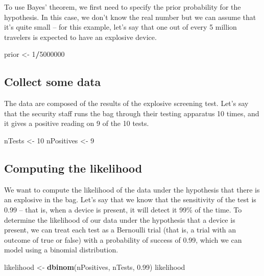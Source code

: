 \documentclass[]{book}
\newenvironment{Shaded}{\begin{snugshade}}{\end{snugshade}}
\newcommand{\KeywordTok}[1]{\textcolor[rgb]{0.13,0.29,0.53}{\textbf{#1}}}
\newcommand{\DecValTok}[1]{\textcolor[rgb]{0.00,0.00,0.81}{#1}}
\newcommand{\FloatTok}[1]{\textcolor[rgb]{0.00,0.00,0.81}{#1}}
\newcommand{\StringTok}[1]{\textcolor[rgb]{0.31,0.60,0.02}{#1}}
\newcommand{\OperatorTok}[1]{\textcolor[rgb]{0.81,0.36,0.00}{\textbf{#1}}}
\newcommand{\NormalTok}[1]{#1}
\theoremstyle{definition}
\theoremstyle{definition}
\theoremstyle{definition}
\theoremstyle{remark}
\begin{document}
To use Bayes' theorem, we first need to specify the prior probability
for the hypothesis. In this case, we don't know the real number but we
can assume that it's quite small -- for this example, let's say that one
out of every 5 million travelers is expected to have an explosive
device.

\begin{Shaded}
\begin{Highlighting}[]
\NormalTok{prior <-}\StringTok{ }\DecValTok{1}\OperatorTok{/}\DecValTok{5000000}
\end{Highlighting}
\end{Shaded}

\subsection{Collect some data}\label{collect-some-data}

The data are composed of the results of the explosive screening test.
Let's say that the security staff runs the bag through their testing
apparatus 10 times, and it gives a positive reading on 9 of the 10
tests.

\begin{Shaded}
\begin{Highlighting}[]
\NormalTok{nTests <-}\StringTok{ }\DecValTok{10}
\NormalTok{nPositives <-}\StringTok{ }\DecValTok{9}
\end{Highlighting}
\end{Shaded}

\subsection{Computing the likelihood}\label{computing-the-likelihood}

We want to compute the likelihood of the data under the hypothesis that
there is an explosive in the bag. Let's say that we know that the
sensitivity of the test is 0.99 -- that is, when a device is present, it
will detect it 99\% of the time. To determine the likelihood of our data
under the hypothesis that a device is present, we can treat each test as
a Bernoulli trial (that is, a trial with an outcome of true or false)
with a probability of success of 0.99, which we can model using a
binomial distribution.

\begin{Shaded}
\begin{Highlighting}[]
\NormalTok{likelihood <-}\StringTok{ }\KeywordTok{dbinom}\NormalTok{(nPositives, nTests, }\FloatTok{0.99}\NormalTok{)}
\NormalTok{likelihood}
\end{Highlighting}
\end{Shaded}
\end{document}
